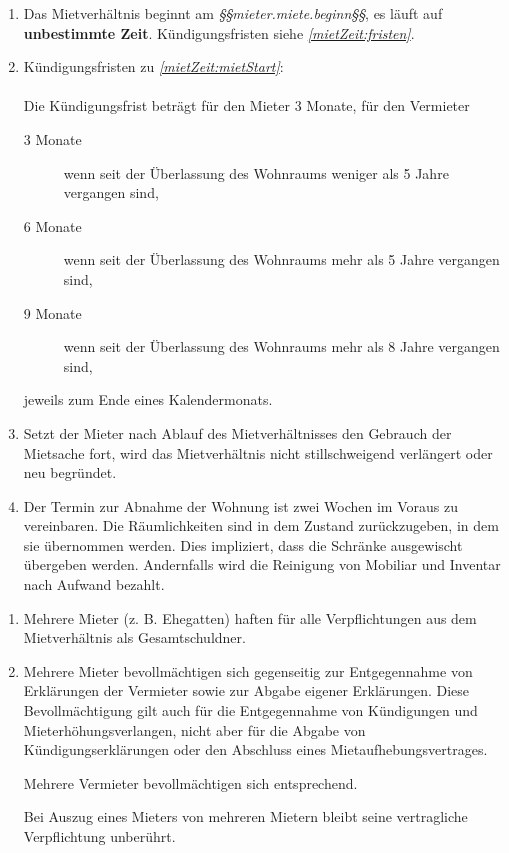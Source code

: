 \documentclass{scrreprt}[12pt,a4paper,twoside,duplex]
\begin{document}
\begin{contract}

\begin{enumerate}
  \item\label{mietZeit:mietStart} Das Mietverhältnis beginnt am
  \textsl{§§mieter.miete.beginn§§}, es läuft auf \textbf{unbestimmte Zeit}. Kün\-di\-gungs\-fris\-ten siehe \textsl{\ref{mietZeit:fristen}}.
  \item\label{mietZeit:fristen} Kün\-di\-gungs\-fris\-ten zu
  \textsl{\ref{mietZeit:mietStart}}:\\\\
  Die Kün\-di\-gungs\-frist beträgt für den Mieter 3 Monate, für den Vermieter\\
  \begin{description}
    \item[3 Monate] wenn seit der Überlassung des Wohnraums weniger als 5 Jahre
    vergangen sind,
    \item[6 Monate] wenn seit der Überlassung des Wohnraums mehr als 5 Jahre vergangen
    sind,
    \item[9 Monate] wenn seit der Überlassung des Wohnraums mehr als 8 Jahre vergangen
    sind,
  \end{description}
  jeweils zum Ende eines Kalendermonats.
  \item Setzt der Mieter nach Ablauf des Mietverhältnisses den Gebrauch der Mietsache fort, wird das Mietverhältnis nicht stillschweigend verlängert oder neu begründet.
  \item Der Termin zur Abnahme der Wohnung ist zwei Wochen im Voraus zu vereinbaren. Die Räumlichkeiten sind in dem Zustand zurückzugeben, in dem sie übernommen werden. Dies impliziert, dass die Schränke ausgewischt übergeben werden. Andernfalls wird die Reinigung von Mobiliar und Inventar nach Aufwand bezahlt.
\end{enumerate}
\end{contract}

\begin{contract}
	\begin{enumerate}
		\item Mehrere Mieter (z. B. Ehegatten) haften für alle Verpflichtungen aus dem Mietverhältnis als Gesamtschuldner.

		\item Mehrere Mieter bevollmächtigen sich gegenseitig zur Entgegennahme von Erklärungen der Vermieter sowie zur Abgabe eigener Erklärungen. Diese Bevollmächtigung gilt auch für die Entgegennahme von Kündigungen und Mieterhöhungsverlangen, nicht aber für die Abgabe von Kündigungserklärungen oder den Abschluss eines Mietaufhebungsvertrages.

		Mehrere Vermieter bevollmächtigen sich entsprechend.

		Bei Auszug eines Mieters von mehreren Mietern bleibt seine vertragliche Verpflichtung unberührt.
	\end{enumerate}
\end{contract}
\end{document}
